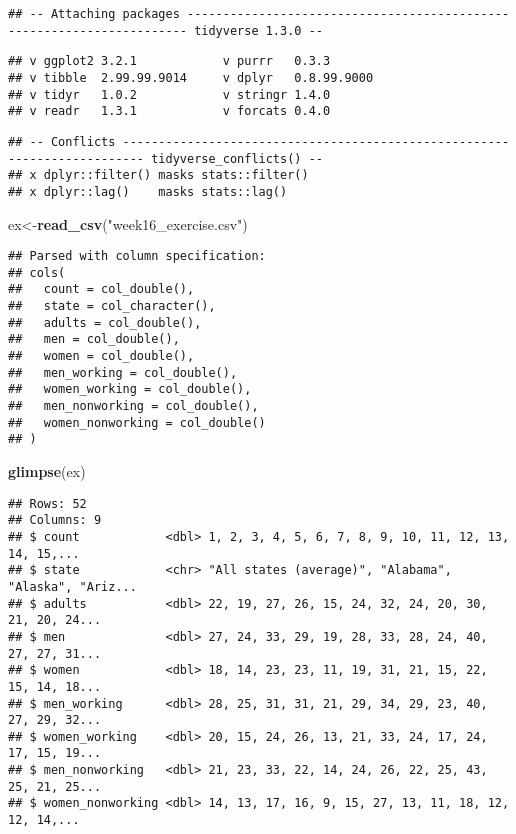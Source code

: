 \documentclass[]{article}
\newenvironment{Shaded}{\begin{snugshade}}{\end{snugshade}}
\newcommand{\KeywordTok}[1]{\textcolor[rgb]{0.13,0.29,0.53}{\textbf{#1}}}
\newcommand{\NormalTok}[1]{#1}
\newcommand{\StringTok}[1]{\textcolor[rgb]{0.31,0.60,0.02}{#1}}
\begin{document}
\begin{verbatim}
## -- Attaching packages ---------------------------------------------------------------------- tidyverse 1.3.0 --
\end{verbatim}

\begin{verbatim}
## v ggplot2 3.2.1            v purrr   0.3.3       
## v tibble  2.99.99.9014     v dplyr   0.8.99.9000 
## v tidyr   1.0.2            v stringr 1.4.0       
## v readr   1.3.1            v forcats 0.4.0
\end{verbatim}

\begin{verbatim}
## -- Conflicts ------------------------------------------------------------------------- tidyverse_conflicts() --
## x dplyr::filter() masks stats::filter()
## x dplyr::lag()    masks stats::lag()
\end{verbatim}

\begin{Shaded}
\begin{Highlighting}[]
\NormalTok{ex<-}\KeywordTok{read_csv}\NormalTok{(}\StringTok{"week16_exercise.csv"}\NormalTok{)}
\end{Highlighting}
\end{Shaded}

\begin{verbatim}
## Parsed with column specification:
## cols(
##   count = col_double(),
##   state = col_character(),
##   adults = col_double(),
##   men = col_double(),
##   women = col_double(),
##   men_working = col_double(),
##   women_working = col_double(),
##   men_nonworking = col_double(),
##   women_nonworking = col_double()
## )
\end{verbatim}

\begin{Shaded}
\begin{Highlighting}[]
\KeywordTok{glimpse}\NormalTok{(ex)}
\end{Highlighting}
\end{Shaded}

\begin{verbatim}
## Rows: 52
## Columns: 9
## $ count            <dbl> 1, 2, 3, 4, 5, 6, 7, 8, 9, 10, 11, 12, 13, 14, 15,...
## $ state            <chr> "All states (average)", "Alabama", "Alaska", "Ariz...
## $ adults           <dbl> 22, 19, 27, 26, 15, 24, 32, 24, 20, 30, 21, 20, 24...
## $ men              <dbl> 27, 24, 33, 29, 19, 28, 33, 28, 24, 40, 27, 27, 31...
## $ women            <dbl> 18, 14, 23, 23, 11, 19, 31, 21, 15, 22, 15, 14, 18...
## $ men_working      <dbl> 28, 25, 31, 31, 21, 29, 34, 29, 23, 40, 27, 29, 32...
## $ women_working    <dbl> 20, 15, 24, 26, 13, 21, 33, 24, 17, 24, 17, 15, 19...
## $ men_nonworking   <dbl> 21, 23, 33, 22, 14, 24, 26, 22, 25, 43, 25, 21, 25...
## $ women_nonworking <dbl> 14, 13, 17, 16, 9, 15, 27, 13, 11, 18, 12, 12, 14,...
\end{verbatim}
\end{document}
